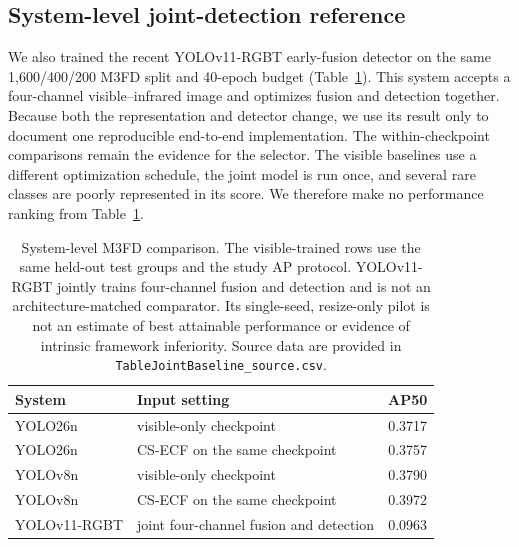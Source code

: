 \subsection{System-level joint-detection reference}

We also trained the recent YOLOv11-RGBT early-fusion detector on the same
1,600/400/200 M3FD split and 40-epoch budget
(Table~\ref{tab:joint-baseline}). This system accepts a four-channel
visible--infrared image and optimizes fusion and detection together. Because
both the representation and detector change, we use its result only to
document one reproducible end-to-end implementation. The within-checkpoint
comparisons remain the evidence for the selector. The visible baselines use a
different optimization schedule, the joint model is run once, and several rare
classes are poorly represented in its score. We therefore make no performance
ranking from Table~\ref{tab:joint-baseline}.

\begin{table}[t]
\centering
\small
\caption{System-level M3FD comparison. The visible-trained rows use the same
held-out test groups and the study AP protocol. YOLOv11-RGBT jointly trains
four-channel fusion and detection and is not an architecture-matched
comparator. Its single-seed, resize-only pilot is not an estimate of best
attainable performance or evidence of intrinsic framework inferiority. Source
data are provided in
\texttt{TableJointBaseline\_source.csv}.}
\label{tab:joint-baseline}
\begin{tabular}{@{}llc@{}}
\toprule
System & Input setting & AP50 \\
\midrule
YOLO26n & visible-only checkpoint & 0.3717 \\
YOLO26n & CS-ECF on the same checkpoint & 0.3757 \\
YOLOv8n & visible-only checkpoint & 0.3790 \\
YOLOv8n & CS-ECF on the same checkpoint & 0.3972 \\
YOLOv11-RGBT & joint four-channel fusion and detection & 0.0963 \\
\bottomrule
\end{tabular}
\end{table}

